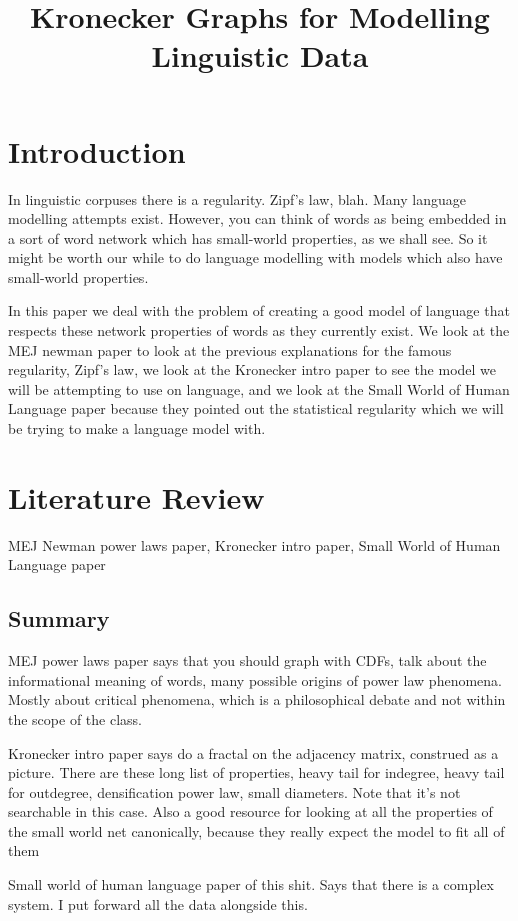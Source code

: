 \documentclass[12pt]{article}
\begin{document}
\title{Kronecker Graphs for Modelling Linguistic Data}

\section{Introduction}

In linguistic corpuses there is a regularity. Zipf's law, blah. Many language modelling attempts exist. However, you can think of words as being embedded in a sort of word network which has small-world properties, as we shall see. So it might be worth our while to do language modelling with models which also have small-world properties.

In this paper we deal with the problem of creating a good model of language that respects these network properties of words as they currently exist. We look at the MEJ newman paper to look at the previous explanations for the famous regularity, Zipf's law, we look at the Kronecker intro paper to see the model we will be attempting to use on language, and we look at the Small World of Human Language paper because they pointed out the statistical regularity which we will be trying to make a language model with.

\section{Literature Review}

MEJ Newman power laws paper, Kronecker intro paper, Small World of Human Language paper

\subsection{Summary}
MEJ power laws paper says that you should graph with CDFs, talk about the informational meaning of words, many possible origins of power law phenomena. Mostly about critical phenomena, which is a philosophical debate and not within the scope of the class.

Kronecker intro paper says do a fractal on the adjacency matrix, construed as a picture. There are these long list of properties, heavy tail for indegree, heavy tail for outdegree, densification power law, small diameters. Note that it's not searchable in this case. Also a good resource for looking at all the properties of the small world net canonically, because they really expect the model to fit all of them

Small world of human language paper of this shit. Says that there is a complex system. I put forward all the data alongside this.
\end{document}
